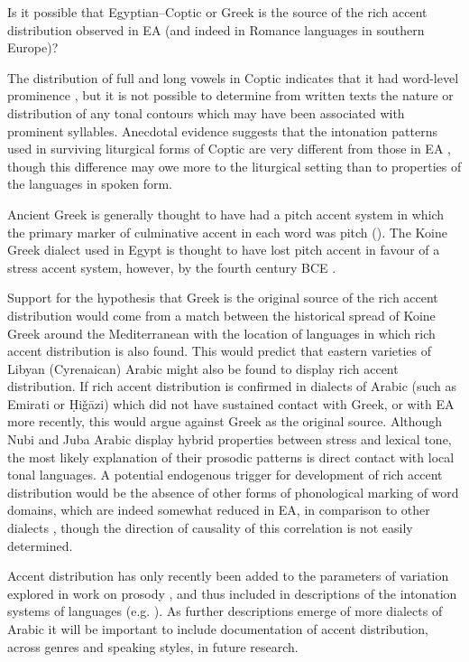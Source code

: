 \documentclass[output=paper]{langsci/langscibook}
\begin{document}
Is it possible that Egyptian--Coptic or Greek is the source of the rich accent distribution observed in EA (and indeed in Romance languages in southern Europe)? 

The distribution of full and long vowels in Coptic indicates that it had word-level prominence \citep[270]{Peust1999}, but it is not possible to determine from written texts the nature or distribution of any tonal contours which may have been associated with prominent syllables. Anecdotal evidence suggests that the intonation patterns used in surviving liturgical forms of Coptic are very different from those in EA \citep[32]{Peust1999}, though this difference may owe more to the liturgical setting than to properties of the languages in spoken form.

Ancient Greek is generally thought to have had a pitch accent system in which the primary marker of culminative accent in each word was pitch (\citealt{DevineStephens1985}). The Koine Greek dialect used in Egypt is thought to have lost pitch accent in favour of a stress accent system, however, by the fourth century BCE \citep{Benaissa2012}. 

Support for the hypothesis that Greek is the original source of the rich accent distribution would come from a match between the historical spread of Koine Greek around the Mediterranean with the location of languages in which rich accent distribution is also found. This would predict that eastern varieties of Libyan (Cyrenaican) Arabic might also be found to display rich accent distribution. If rich accent distribution is confirmed in dialects of Arabic (such as Emirati or Ḥiǧāzi) which did not have sustained contact with Greek, or with EA more recently, this would argue against Greek as the original source. Although Nubi \citep{Gussenhoven2006} and Juba Arabic \citep{Nakao2013} display hybrid properties between stress and lexical tone, the most likely explanation of their prosodic patterns is direct contact with local tonal languages. A potential endogenous trigger for development of rich accent distribution would be the absence of other forms of phonological marking of word domains, which are indeed somewhat reduced in EA, in comparison to other dialects \citep{Watson2002}, though the direction of causality of this correlation is not easily determined. 

Accent distribution has only recently been added to the parameters of variation explored in work on prosody \citep{Hellmuth2007}, and thus included in descriptions of the intonation systems of languages (e.g. \citealt{FrotaPrieto2015}). As further descriptions emerge of more dialects of Arabic it will be important to include documentation of accent distribution, across genres and speaking styles, in future research.
\end{document}
